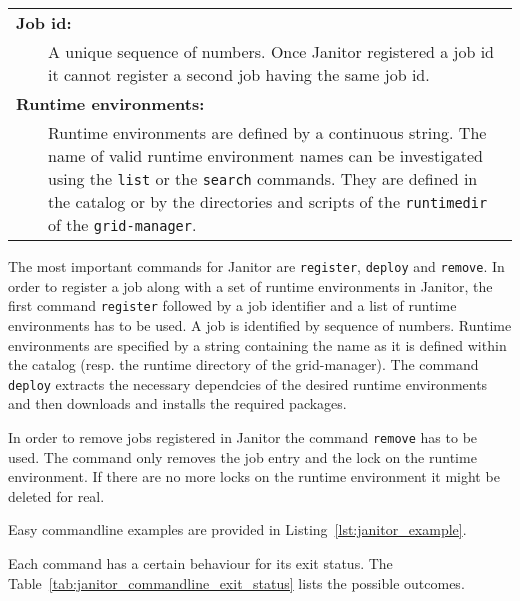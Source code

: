 \begin{table}[!h]
\begin{center}
\begin{tabular}{p{0.5cm}p{2cm}p{11cm}}
	\multicolumn{3}{l}{\textbf{Job id:}}\\
	&					& A unique sequence of numbers. Once Janitor registered a job id it cannot register a second job having the same job id.\\
	\multicolumn{3}{l}{\textbf{Runtime environments:}}\\
	&					& Runtime environments are defined by a continuous string. The name of valid runtime environment names can be investigated using the \texttt{list} or the \texttt{search} commands. They are defined in the catalog or by the directories and scripts of the \texttt{runtimedir} of the \texttt{grid-manager}.\\
	\end{tabular} 
   \end{center}
\end{table}
The most important commands for Janitor are \texttt{register}, \texttt{deploy} and \texttt{remove}. In order to 
register a job along with a set of runtime environments in Janitor, the first command \texttt{register} followed
by a job identifier and a list of runtime environments has to be used.
A job is identified by sequence of numbers. Runtime environments are specified by a string containing the name as it is defined 
within the catalog (resp. the runtime directory of the grid-manager).
The command \texttt{deploy} extracts the necessary dependcies of the desired runtime environments and then downloads and installs 
the required packages. %

In order to remove jobs registered in Janitor the command \texttt{remove} has to be used. 
The command only removes the job entry and the lock on the runtime environment. If there are no more locks on the runtime environment
it might be deleted for real.

Easy commandline examples are provided in Listing~\ref{lst:janitor_example}.

Each command has a certain behaviour for its exit status. The Table~\ref{tab:janitor_commandline_exit_status} lists the possible
outcomes.


